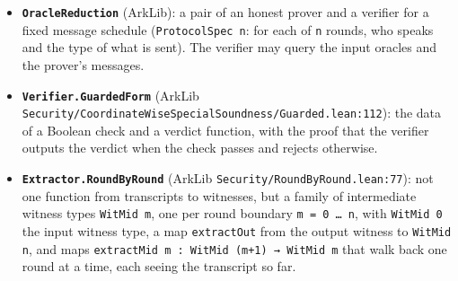 \begin{itemize}
\item \textbf{\texttt{OracleReduction}} (ArkLib): a pair of an honest prover and a verifier for a fixed message schedule (\texttt{ProtocolSpec n}: for each of \texttt{n} rounds, who speaks and the type of what is sent). The verifier may query the input oracles and the prover's messages.
\item \textbf{\texttt{Verifier.\allowbreak{}GuardedForm}} (ArkLib \texttt{S\allowbreak{}e\allowbreak{}c\allowbreak{}u\allowbreak{}r\allowbreak{}i\allowbreak{}t\allowbreak{}y\allowbreak{}/\allowbreak{}C\allowbreak{}o\allowbreak{}o\allowbreak{}r\allowbreak{}d\allowbreak{}i\allowbreak{}n\allowbreak{}a\allowbreak{}t\allowbreak{}e\allowbreak{}W\allowbreak{}i\allowbreak{}s\allowbreak{}e\allowbreak{}S\allowbreak{}p\allowbreak{}e\allowbreak{}c\allowbreak{}i\allowbreak{}a\allowbreak{}l\allowbreak{}S\allowbreak{}o\allowbreak{}u\allowbreak{}n\allowbreak{}d\allowbreak{}n\allowbreak{}e\allowbreak{}s\allowbreak{}s\allowbreak{}/\allowbreak{}G\allowbreak{}u\allowbreak{}a\allowbreak{}r\allowbreak{}d\allowbreak{}e\allowbreak{}d\allowbreak{}.\allowbreak{}l\allowbreak{}e\allowbreak{}a\allowbreak{}n\allowbreak{}:\allowbreak{}1\allowbreak{}1\allowbreak{}2}): the data of a Boolean check and a verdict function, with the proof that the verifier outputs the verdict when the check passes and rejects otherwise.
\item \textbf{\texttt{Extractor.\allowbreak{}RoundByRound}} (ArkLib \texttt{S\allowbreak{}e\allowbreak{}c\allowbreak{}u\allowbreak{}r\allowbreak{}i\allowbreak{}t\allowbreak{}y\allowbreak{}/\allowbreak{}R\allowbreak{}o\allowbreak{}u\allowbreak{}n\allowbreak{}d\allowbreak{}B\allowbreak{}y\allowbreak{}R\allowbreak{}o\allowbreak{}u\allowbreak{}n\allowbreak{}d\allowbreak{}.\allowbreak{}l\allowbreak{}e\allowbreak{}a\allowbreak{}n\allowbreak{}:\allowbreak{}7\allowbreak{}7}): not one function from transcripts to witnesses, but a family of intermediate witness types \texttt{WitMid m}, one per round boundary \texttt{m = 0 … n}, with \texttt{WitMid 0} the input witness type, a map \texttt{extractOut} from the output witness to \texttt{WitMid n}, and maps \texttt{e\allowbreak{}x\allowbreak{}t\allowbreak{}r\allowbreak{}a\allowbreak{}c\allowbreak{}t\allowbreak{}M\allowbreak{}i\allowbreak{}d\allowbreak{} m\allowbreak{} :\allowbreak{} W\allowbreak{}i\allowbreak{}t\allowbreak{}M\allowbreak{}i\allowbreak{}d\allowbreak{} (\allowbreak{}m\allowbreak{}+\allowbreak{}1\allowbreak{})\allowbreak{} →\allowbreak{} W\allowbreak{}i\allowbreak{}t\allowbreak{}M\allowbreak{}i\allowbreak{}d\allowbreak{} m} that walk back one round at a time, each seeing the transcript so far.

\end{itemize}
